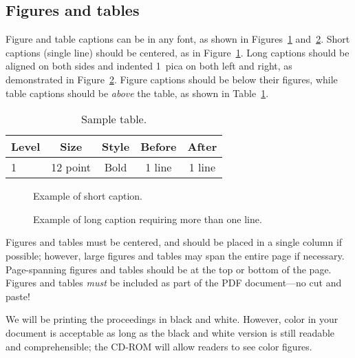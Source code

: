 \documentclass[10pt,twocolumn]{article}
\begin{document}
\subsection{Figures and tables}

Figure and table captions can be in any font, as shown in
Figures~\ref{fig:shortcaption} and~\ref{fig:longcaption}.  Short
captions (single line) should be centered, as in
Figure~\ref{fig:shortcaption}.  Long captions should be aligned on
both sides and indented 1~pica on both left and right, as demonstrated
in Figure~\ref{fig:longcaption}.  Figure captions should be below
their figures, while table captions should be \emph{above} the table,
as shown in Table~\ref{tab:sample}.

\begin{table}
\caption{Sample table.}
\label{tab:sample}
\begin{center}
\begin{tabular}{|l|c|c|c|c|} \hline
\textbf{Level} & \textbf{Size} & \textbf{Style} & \textbf{Before} & \textbf{After} \\ \hline \hline
1 & 12 point & Bold & 1 line & 1 line \\ \hline
\end{tabular}
\end{center}
\end{table}

\begin{figure}
  \centerline{}
  \caption{Example of short caption.}
  \label{fig:shortcaption}
\end{figure}

\begin{figure}
  \centerline{}
  \caption{Example of long caption requiring more than one line.}
  \label{fig:longcaption}
\end{figure}


Figures and tables must be centered, and should be placed in a single
column if possible; however, large figures and tables may span the
entire page if necessary.  Page-spanning figures and tables should be
at the top or bottom of the page.  Figures and tables \emph{must} be
included as part of the PDF document---no cut and paste!

We will be printing the proceedings in black and white.  However,
color in your document is acceptable as long as the black and white
version is still readable and comprehensible; the CD-ROM will allow
readers to see color figures.
\end{document}
